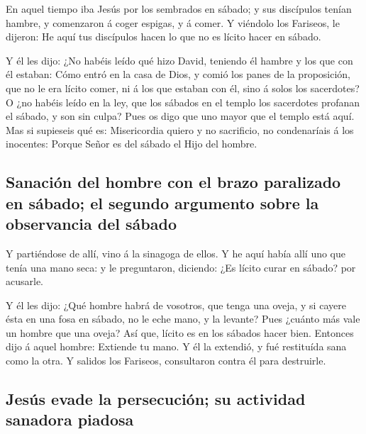  En aquel tiempo iba Jesús por los sembrados en sábado; y
sus discípulos tenían hambre, y comenzaron á coger espigas, y á comer.
 Y viéndolo los Fariseos, le dijeron: He aquí tus
discípulos hacen lo que no es lícito hacer en sábado.

 Y él les dijo: ¿No habéis leído qué hizo David, teniendo
él hambre y los que con él estaban:  Cómo entró en la casa
de Dios, y comió los panes de la proposición, que no le era lícito
comer, ni á los que estaban con él, sino á solos los sacerdotes?
 O ¿no habéis leído en la ley, que los sábados en el
templo los sacerdotes profanan el sábado, y son sin culpa?
 Pues os digo que uno mayor que el templo está aquí.
 Mas si supieseis qué es: Misericordia quiero y no
sacrificio, no condenaríais á los inocentes:  Porque Señor
es del sábado el Hijo del hombre.

\hypertarget{sanaciuxf3n-del-hombre-con-el-brazo-paralizado-en-suxe1bado-el-segundo-argumento-sobre-la-observancia-del-suxe1bado}{%
\subsection{Sanación del hombre con el brazo paralizado en sábado; el
segundo argumento sobre la observancia del
sábado}\label{sanaciuxf3n-del-hombre-con-el-brazo-paralizado-en-suxe1bado-el-segundo-argumento-sobre-la-observancia-del-suxe1bado}}

 Y partiéndose de allí, vino á la sinagoga de ellos.
 Y he aquí había allí uno que tenía una mano seca: y le
preguntaron, diciendo: ¿Es lícito curar en sábado? por acusarle.

 Y él les dijo: ¿Qué hombre habrá de vosotros, que tenga
una oveja, y si cayere ésta en una fosa en sábado, no le eche mano, y la
levante?  Pues ¿cuánto más vale un hombre que una oveja?
Así que, lícito es en los sábados hacer bien.  Entonces
dijo á aquel hombre: Extiende tu mano. Y él la extendió, y fué
restituída sana como la otra.  Y salidos los Fariseos,
consultaron contra él para destruirle.

\hypertarget{jesuxfas-evade-la-persecuciuxf3n-su-actividad-sanadora-piadosa}{%
\subsection{Jesús evade la persecución; su actividad sanadora
piadosa}\label{jesuxfas-evade-la-persecuciuxf3n-su-actividad-sanadora-piadosa}}

